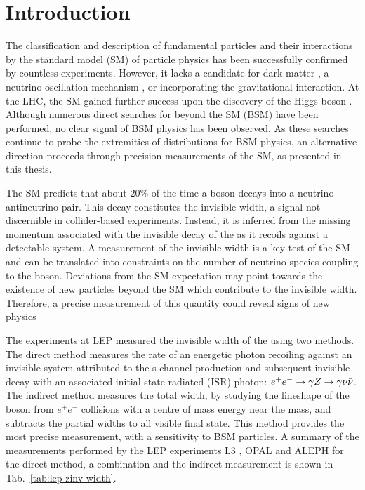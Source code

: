 \chapter{Introduction}
\label{chap:introduction}


The classification and description of fundamental particles and their
interactions by the standard model (SM) of particle physics has been
successfully confirmed by countless experiments. However, it lacks a
candidate for dark matter \cite{Ade:2015xua,Corbelli:1999af}, a neutrino
oscillation mechanism \cite{Fukuda:1998ah,Ahmad:2002jz,Eguchi:2002dm}, or
incorporating the gravitational interaction. At the LHC, the SM gained further
success upon the discovery of the Higgs boson
\cite{Aad:1471031,Chatrchyan:1471016}. Although numerous direct searches for
beyond the SM (BSM) have been performed, no clear signal of BSM physics has
been observed. As these searches continue to probe the extremities of
distributions for BSM physics, an alternative direction proceeds through
precision measurements of the SM, as presented in this thesis.

The SM predicts that about $20\%$ \cite{PhysRevD.98.030001} of the time a \PZ
boson decays into a neutrino-antineutrino pair. This decay constitutes the \PZ
invisible width, a signal not discernible in collider-based experiments.
Instead, it is inferred from the missing momentum associated with the invisible decay of the \PZ as it recoils against a detectable system. A measurement of the \PZ invisible width is a key test of the SM and can be translated into constraints on the number of neutrino species coupling to the \PZ boson. Deviations from the SM expectation may point towards the existence of new particles beyond the SM which contribute to the \PZ invisible width. Therefore, a precise measurement of this quantity could reveal signs of new physics

The experiments at LEP measured the invisible width of the \PZ using two
methods. The direct method measures the rate of an energetic photon recoiling
against an invisible system attributed to the s-channel \PZ production and
subsequent invisible decay with an associated initial state radiated (ISR)
photon: $e^+e^-\rightarrow \gamma Z \rightarrow \gamma\nu\bar{\nu}$. The indirect method
measures the total \PZ width, by studying the lineshape of the \PZ boson from
$e^+e^-$ collisions with a centre of mass energy near the \PZ mass, and
subtracts the partial widths to all visible final state. This method provides
the most precise measurement, with a sensitivity to BSM particles. A summary
of the measurements performed by the LEP experiments L3
\cite{Acciarri:1998vf}, OPAL \cite{Akers:1994vh} and ALEPH
\cite{Buskulic:1993ke} for the direct method, a combination and the indirect
measurement is shown in Tab.~\ref{tab:lep-zinv-width}.

